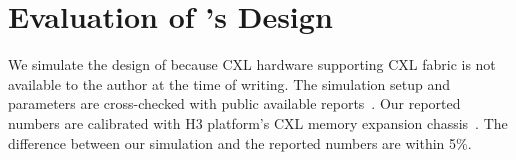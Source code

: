 



\section{Evaluation of \aurelia's Design}
\label{sec:cc-design}
%
We simulate the design of \aurelia because CXL hardware supporting CXL fabric is not available to the author at the time of writing.
% 
The simulation setup and parameters are cross-checked with public available reports~\cite{pond:asplos:2023, demystifying-cxl:micro:2023,h3platform-cxl-memory}. 
%
Our reported numbers are calibrated with H3 platform's CXL memory expansion chassis~\cite{h3platform-cxl-memory}. The difference between our simulation and the reported numbers are within 5\%.

